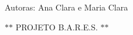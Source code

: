 Autoras\+: Ana Clara e Maria Clara

$\ast$$\ast$ P\+R\+O\+J\+E\+T\+O B.\+A.\+R.\+E.\+S. $\ast$$\ast$ 